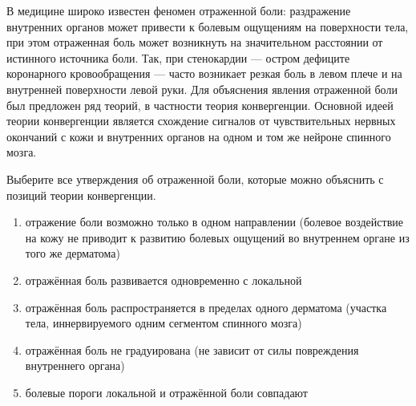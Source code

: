 
В медицине широко известен феномен отраженной боли:
раздражение внутренних органов может привести к болевым ощущениям на
поверхности тела, при этом отраженная боль может возникнуть на значительном
расстоянии от истинного источника боли. Так, при стенокардии — остром дефиците
коронарного кровообращения — часто возникает резкая боль в левом плече и на
внутренней поверхности левой руки. Для объяснения явления отраженной боли был
предложен ряд теорий, в частности теория конвергенции. Основной идеей теории
конвергенции является схождение сигналов от чувствительных нервных окончаний с
кожи и внутренних органов на одном и том же нейроне спинного мозга.

Выберите все утверждения об отраженной боли,
которые можно объяснить с позиций теории конвергенции.

\begin{enumerate}
    \item отражение боли возможно только в одном направлении (болевое воздействие на кожу не приводит к развитию болевых ощущений во внутреннем органе из того же дерматома)
    \item отражённая боль развивается одновременно с локальной
    \item отражённая боль распространяется в пределах одного дерматома (участка тела, иннервируемого одним сегментом спинного мозга)
    \item отражённая боль не градуирована (не зависит от силы повреждения внутреннего органа)
    \item болевые пороги локальной и отражённой боли совпадают
\end{enumerate}



